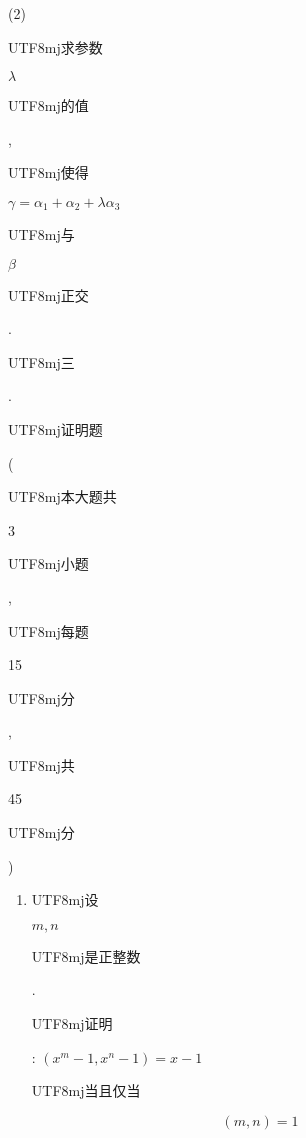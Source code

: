 \documentclass[10pt]{article}
\begin{document}
(2) \begin{CJK}{UTF8}{mj}求参数\end{CJK} $\lambda$ \begin{CJK}{UTF8}{mj}的值\end{CJK}, \begin{CJK}{UTF8}{mj}使得\end{CJK} $\gamma=\alpha_{1}+\alpha_{2}+\lambda \alpha_{3}$ \begin{CJK}{UTF8}{mj}与\end{CJK} $\beta$ \begin{CJK}{UTF8}{mj}正交\end{CJK}.

\begin{CJK}{UTF8}{mj}三\end{CJK}. \begin{CJK}{UTF8}{mj}证明题\end{CJK} (\begin{CJK}{UTF8}{mj}本大题共\end{CJK} 3 \begin{CJK}{UTF8}{mj}小题\end{CJK}, \begin{CJK}{UTF8}{mj}每题\end{CJK} 15 \begin{CJK}{UTF8}{mj}分\end{CJK}, \begin{CJK}{UTF8}{mj}共\end{CJK} 45 \begin{CJK}{UTF8}{mj}分\end{CJK})

\begin{enumerate}
  \item \begin{CJK}{UTF8}{mj}设\end{CJK} $m, n$ \begin{CJK}{UTF8}{mj}是正整数\end{CJK}. \begin{CJK}{UTF8}{mj}证明\end{CJK}: $\left(x^{m}-1, x^{n}-1\right)=x-1$ \begin{CJK}{UTF8}{mj}当且仅当\end{CJK}
\end{enumerate}
$$
(m, n)=1
$$
\end{document}
